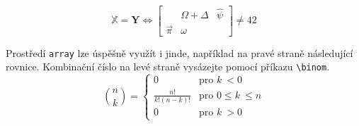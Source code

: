 \documentclass[a4paper, 11pt, twocolumn]{article}
\begin{document}
    $$
        \mathbb{X} = \textbf{Y}\iff
        \left [
        \begin{array}{ccc}
            & \Omega + \Delta & \hat{\psi} \\
            \vec{\pi} & \omega  & 
        \end{array}
        \right ]
        \neq 42
    $$
    
    Prostředí \texttt{array} lze úspěšně využít i jinde, například na
    pravé straně následující rovnice. Kombinační číslo na levé
    straně vysázejte pomocí příkazu \verb|\binom|.   
    $$
        \binom{n}{k}  = \left\{
        \begin{array}{cl}
            0 & \textrm{pro } k~< 0 \\
            \frac{n!}{k!(n-k)!} & \textrm{pro } 0 \leq k~\leq n \\
            0 & \textrm{pro } k~> 0
        \end{array}
        \right.
    $$ 
\end{document}
